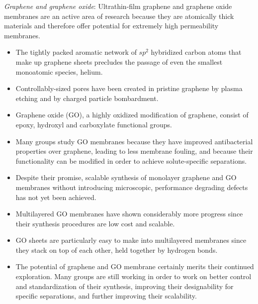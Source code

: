   \textit{Graphene and graphene oxide}: Ultrathin-film graphene and graphene oxide membranes
  are an active area of research because they are atomically thick materials and therefore 
  offer potential for extremely high permeability membranes.~\cite{humplik_nanostructured_2011} 
  \begin{itemize}
    \item The tightly packed aromatic network of $sp^2$ hybridized carbon atoms that 
    make up graphene sheets precludes the passage of even the smallest monoatomic species, helium.~\cite{bunch_impermeable_2008}
    \item Controllably-sized pores have been created in pristine graphene by plasma etching
    and by charged particle bombardment.~\cite{surwade_water_2015,russo_atom-by-atom_2012}
    \item Graphene oxide (GO), a highly oxidized modification of graphene, consist of epoxy,
    hydroxyl and carboxylate functional groups.~\cite{hegab_graphene_2015}
    \item Many groups study GO membranes because they have improved antibacterial properties 
    over graphene, leading to less membrane fouling, and because their functionality can be
    modified in order to achieve solute-specific separations.~\cite{liu_antibacterial_2011,he_bioinspired_2013}
    \item Despite their promise, scalable synthesis of monolayer graphene and GO membranes without
    introducing microscopic, performance degrading defects has not yet been achieved.~\cite{cohen-tanugi_multilayer_2016,wei_multilayered_2018}
    \item Multilayered GO membranes have shown considerably more progress since their 
    synthesis procedures are low cost and scalable.~\cite{zhang_size-controlled_2009}
    \item GO sheets are particularly easy to make into multilayered membranes since they 
    stack on top of each other, held together by hydrogen bonds.~\cite{homaeigohar_graphene_2017}
    \item The potential of graphene and GO membrane certainly merits their continued exploration. Many
    groups are still working in order to work on better control and standardization of their synthesis,
    improving their designability for specific separations, and further improving their scalability.~\cite{wei_multilayered_2018}
  \end{itemize}    
  
